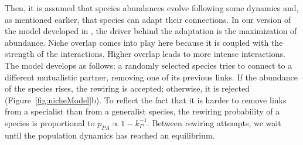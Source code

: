 Then, it is assumed that species abundances evolve following some dynamics and, as mentioned earlier, that species can adapt their connections. In our version of the model developed in \cite{palazzi2021ecological}, the driver behind the adaptation is the maximization of abundance.  Niche overlap comes into play here because it is coupled with the strength of the interactions. Higher overlap leads to more intense interactions. The model develops as follows: a randomly selected species tries to connect to a different mutualistic partner, removing one of its previous links. If the abundance of the species rises, the rewiring is accepted; otherwise, it is rejected (Figure~\ref{fig:nicheModel}b).  To reflect the fact that it is harder to remove links from a specialist than from a generalist species, the rewiring probability of a species is proportional to $p_{PA} \propto 1 - k_{P}^{-1}$. Between rewiring attempts, we wait until the population dynamics has reached an equilibrium. \\

